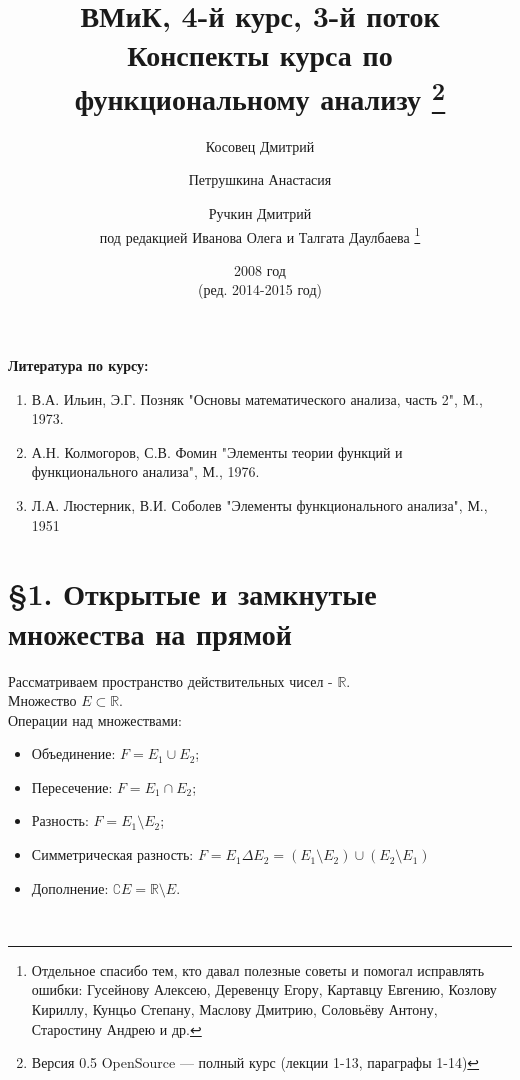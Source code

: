 \documentclass[12pt,a4paper, titlepage]{article}
\begin{document}
\author{Косовец Дмитрий \and Петрушкина Анастасия \and Ручкин Дмитрий \\
под редакцией Иванова Олега и Талгата Даулбаева \thanks{Отдельное спасибо тем, кто давал полезные советы и помогал исправлять ошибки: Гусейнову Алексею, Деревенцу Егору, Картавцу Евгению, Козлову Кириллу, Кунцьо Степану, Маслову Дмитрию, Соловьёву Антону, Старостину Андрею и др.}}
\title{ВМиК, 4-й курс, 3-й поток \\ Конспекты курса по функциональному анализу \thanks{Версия 0.5 OpenSource --- полный курс (лекции 1-13, параграфы 1-14) }}
\date{2008 год \\ (ред. 2014-2015 год)}


\maketitle


\textbf{Литература по курсу:}
\begin{enumerate}
\item В.А. Ильин, Э.Г. Позняк "Основы математического анализа, часть 2", М., 1973.
\item А.Н. Колмогоров, С.В. Фомин "Элементы теории функций и функционального анализа", М., 1976.
\item Л.А. Люстерник, В.И. Соболев "Элементы функционального анализа", М., 1951
\end{enumerate}

\parindent=0cm

\pagebreak

\section*{\S 1. Открытые и замкнутые множества на прямой}

 Рассматриваем пространство действительных чисел - $\mathbb{R}$.\\
Множество $E\subset\mathbb{R}$.\\

Операции над множествами:
\begin{itemize}
\item Объединение: $F = E_1 \cup E_2$;
\item Пересечение: $F = E_1 \cap E_2$;
\item Разность: $F = E_1 \setminus E_2$;
\item Симметрическая разность: $F = E_1 \Delta E_2 = (E_1 \setminus E_2) \cup (E_2 \setminus E_1)$
\item Дополнение: $ \complement E = \mathbb{R} \setminus E$.
\end{itemize}\
\end{document}
